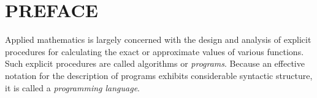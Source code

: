 
\chapter*{PREFACE}

\par Applied mathematics is largely concerned with the design and analysis of explicit procedures for calculating the exact or approximate values of various functions. Such explicit procedures are called algorithms or \textit{programs}. Because an effective notation for the description of programs exhibits considerable syntactic structure, it is called a \textit{programming language}.
